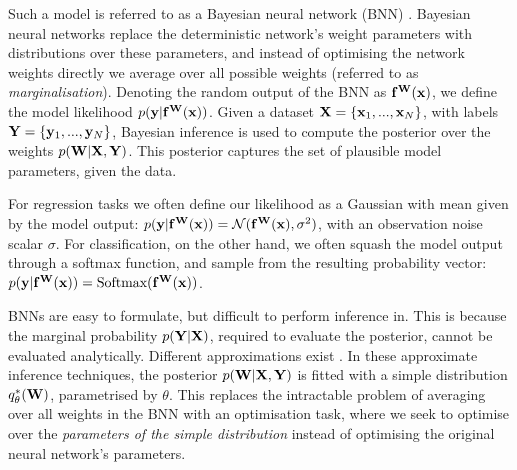 Such a model is referred to as a Bayesian neural network (BNN) \citep{ denker1991transforming, mackay1992practical, neal1995bayesian}. 
Bayesian neural networks replace the deterministic network's weight parameters with distributions over these parameters, and instead of optimising the network weights directly we average over all possible weights (referred to as \textit{marginalisation}). 
Denoting the random output of the BNN as $\mathbf{f}^{\mathbf{W}}(\mathbf{x})$, we define the model likelihood $p(\mathbf{y} | \mathbf{f}^{\mathbf{W}}(\mathbf{x}))$.
Given a dataset $\mathbf{X}=\{\mathbf{x}_1, ..., \mathbf{x}_N\}$, with labels $\mathbf{Y}=\{\mathbf{y}_1, ..., \mathbf{y}_N\}$, Bayesian inference is used to compute the posterior over the weights $p(\mathbf{W} | \mathbf{X}, \mathbf{Y})$. This posterior captures the set of plausible model parameters, given the data.

For regression tasks we often define our likelihood as a Gaussian with mean given by the model output:
$
p(\mathbf{y} | \mathbf{f}^{\mathbf{W}}(\mathbf{x})) = \mathcal{N}(\mathbf{f}^{\mathbf{W}}(\mathbf{x}), \sigma^2)
$,
with an observation noise scalar $\sigma$. 
For classification, on the other hand, we often squash the model output through a softmax function, and sample from the resulting probability vector:
$
p(\mathbf{y} | \mathbf{f}^{\mathbf{W}}(\mathbf{x})) = \text{Softmax}(\mathbf{f}^{\mathbf{W}}(\mathbf{x}))
$.

BNNs are easy to formulate, but difficult to perform inference in. This is because the marginal probability $p(\mathbf{Y} | \mathbf{X})$, required to evaluate the posterior, cannot be evaluated analytically. Different approximations exist \citep{graves2011practical, blundell2015weight, hernandez2016black, Gal2016Bayesian}.
In these approximate inference techniques, the posterior $p(\mathbf{W} | \mathbf{X}, \mathbf{Y})$ is fitted with a simple distribution $q_\theta^*(\mathbf{W})$, parametrised by $\theta$. This replaces the intractable problem of averaging over all weights in the BNN with an optimisation task, where we seek to optimise over the \textit{parameters of the simple distribution} instead of optimising the original neural network's parameters.

